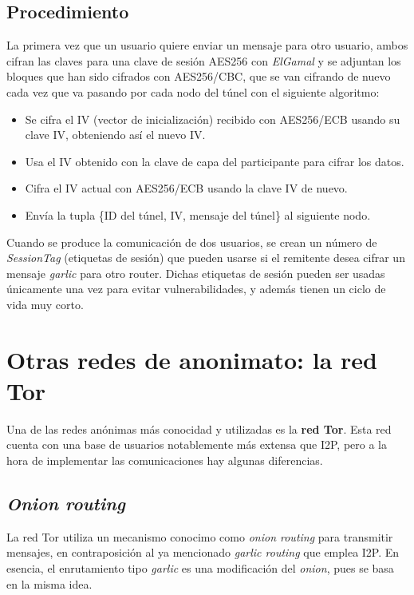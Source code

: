 \subsection*{Procedimiento}



La primera vez que un usuario quiere enviar un mensaje para otro usuario, ambos cifran las claves para una clave de sesión AES256 con \textit{ElGamal} y se adjuntan los bloques que han
sido cifrados con AES256/CBC, que se van cifrando de nuevo cada vez que va pasando por cada nodo del túnel con el siguiente algoritmo:

\begin{itemize}
	\item Se cifra el IV (vector de inicialización) recibido con AES256/ECB usando su clave IV, obteniendo así el nuevo IV.
	\item Usa el IV obtenido con la clave de capa del participante para cifrar los datos.
	\item Cifra el IV actual con AES256/ECB usando la clave IV de nuevo.
	\item Envía la tupla \{ID del túnel, IV, mensaje del túnel\} al siguiente nodo.


\end{itemize}

Cuando se produce la comunicación de dos usuarios, se crean un número de \textit{SessionTag} (etiquetas de sesión) que pueden usarse si el remitente desea cifrar un mensaje \textit{garlic} para otro router. Dichas etiquetas de sesión pueden ser usadas únicamente una vez para evitar vulnerabilidades, y además tienen un ciclo de vida muy corto.





    \section{Otras redes de anonimato: la red Tor}
    
    Una de las redes anónimas más conocidad y utilizadas es la \textbf{red Tor}. Esta red cuenta con una base de usuarios notablemente más extensa que I2P, pero a la hora de implementar las comunicaciones hay algunas diferencias.
    
    \subsection{\textit{Onion routing}}
    La red Tor utiliza un mecanismo conocimo como \textit{onion routing} para transmitir mensajes, en contraposición al ya mencionado \textit{garlic routing} que emplea I2P. En esencia, el enrutamiento tipo \textit{garlic} es una modificación del \textit{onion}, pues se basa en la misma idea.\\
    
